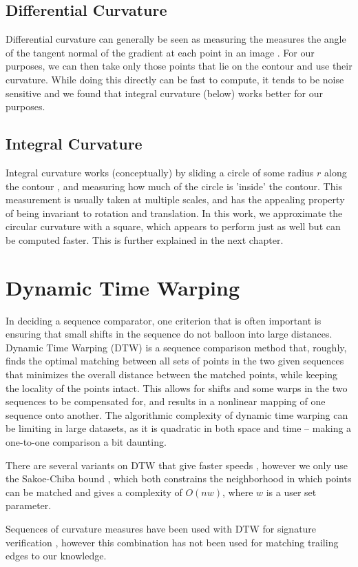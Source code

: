 \subsection{Differential Curvature}

Differential curvature can generally be seen as measuring the measures the angle of the tangent normal of the gradient at each point in an image \cite{fischer2014image}.
For our purposes, we can then take only those points that lie on the contour and use their curvature.
While doing this directly can be fast to compute, it tends to be noise sensitive and we found that integral curvature (below) works better for our purposes.

\subsection{Integral Curvature}

Integral curvature works (conceptually) by sliding a circle of some radius $r$ along the contour \cite{pottmann2007integral}, and measuring how much of the circle is 'inside' the contour.
This measurement is usually taken at multiple scales, and has the appealing property of being invariant to rotation and translation.
In this work, we approximate the circular curvature with a square, which appears to perform just as well but can be computed faster.
This is further explained in the next chapter.

\section{Dynamic Time Warping}

In deciding a sequence comparator, one criterion that is often important is ensuring that small shifts in the sequence do not balloon into large distances.
Dynamic Time Warping (DTW) is a sequence comparison method that, roughly, finds the optimal matching between all sets of points in the two given sequences that minimizes the overall distance between the matched points, while keeping the locality of the points intact.
This allows for shifts and some warps in the two sequences to be compensated for, and results in a nonlinear mapping of one sequence onto another.
The algorithmic complexity of dynamic time warping can be limiting in large datasets, as it is quadratic in both space and time -- making a one-to-one comparison a bit daunting.

There are several variants on DTW that give faster speeds \cite{salvador2007fastdtw} \cite{lemire2009faster}, however we only use the Sakoe-Chiba bound \cite{sakoe1978dynamic}, which both constrains the neighborhood in which points can be matched and gives a complexity of $O(nw)$, where $w$ is a user set parameter.

Sequences of curvature measures have been used with DTW for signature verification \cite{munich1999continuous}, however this combination has not been used for matching trailing edges to our knowledge.


